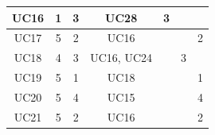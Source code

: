 \documentclass[12pt]{article}
\begin{document}
\begin{longtable}{|c|ccc|l|l|l|}
		UC16                 & \multicolumn{1}{c|}{1}               & \multicolumn{1}{c|}{3}                                                                         & UC28               & \multicolumn{1}{c|}{3}                                                                     &                                                                                               &                                                                                            \\ \hline
		UC17                 & \multicolumn{1}{c|}{5}               & \multicolumn{1}{c|}{2}                                                                         & UC16               &                                                                                            &                                                                                               & \multicolumn{1}{c|}{2}                                                                     \\ \hline
		UC18                 & \multicolumn{1}{c|}{4}               & \multicolumn{1}{c|}{3}                                                                         & UC16, UC24         &                                                                                            & \multicolumn{1}{c|}{3}                                                                        &                                                                                            \\ \hline
		UC19                 & \multicolumn{1}{c|}{5}               & \multicolumn{1}{c|}{1}                                                                         & UC18               &                                                                                            &                                                                                               & \multicolumn{1}{c|}{1}                                                                     \\ \hline
		UC20                 & \multicolumn{1}{c|}{5}               & \multicolumn{1}{c|}{4}                                                                         & UC15               &                                                                                            &                                                                                               & \multicolumn{1}{c|}{4}                                                                     \\ \hline
		UC21                 & \multicolumn{1}{c|}{5}               & \multicolumn{1}{c|}{2}                                                                         & UC16               &                                                                                            &                                                                                               & \multicolumn{1}{c|}{2}                                                                     \\ \hline

\end{longtable}
\end{document}
